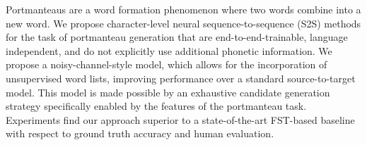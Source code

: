 Portmanteaus are a word formation phenomenon where two words combine into a new word. We propose character-level neural sequence-to-sequence (S2S) methods for the task of portmanteau generation that are end-to-end-trainable, language independent, and do not explicitly use additional phonetic information. We propose a noisy-channel-style model, which allows for the incorporation of unsupervised word lists, improving performance over a standard source-to-target model. This model is made possible by an exhaustive candidate generation strategy specifically enabled by the features of the portmanteau task. Experiments find our approach superior to a state-of-the-art FST-based baseline with respect to ground truth accuracy and human evaluation.
